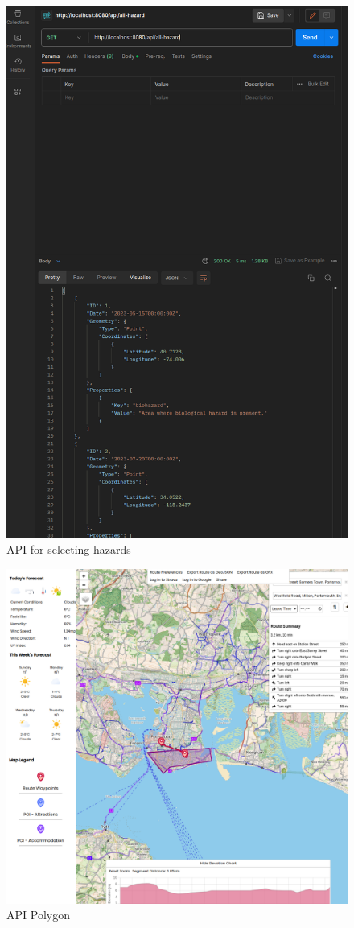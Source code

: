 \begin{figure}[!ht]
    \centering
    \includegraphics[width=425px]{figures/Progress Images/Iteration-2/SR32-37/SR32 - Basic API for selecting hazards.png}
    \caption{API for selecting hazards}
    \label{fig:select-hazard}
\end{figure}

\begin{figure}[!ht]
    \centering
    \includegraphics[width=425px]{figures/Progress Images/Iteration-2/SR32-37/SR32 - Basic Polygon from API.png}
    \caption{API Polygon}
    \label{fig:polygon}
\end{figure}

